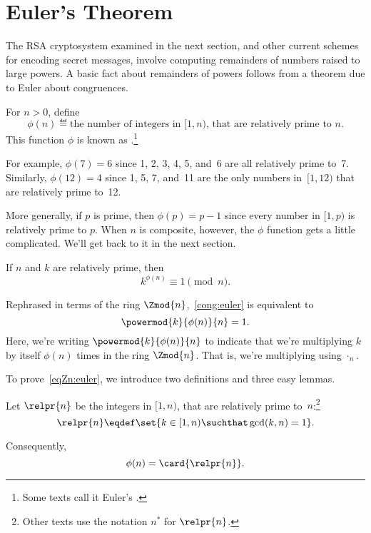 \section{Euler's Theorem}\label{Euler_sec}

The RSA cryptosystem examined in the next section, and other current
schemes for encoding secret messages, involve computing remainders of
numbers raised to large powers.  A basic fact about remainders of
powers follows from a theorem due to Euler about congruences.

\begin{definition}
For $n>0$, define
\[
\phi(n) \eqdef \text{the number of integers in $[1, n)$, that are relatively prime
  to~$n$.}
\]
This function $\phi$ is known as .\footnote{Some texts call it Euler's .}
\end{definition}

For example, $\phi(7) = 6$ since 1, 2, 3, 4, 5, and~6
are all relatively prime to~7.  Similarly, $\phi(12) = 4$ since 1, 5,
7, and~11 are the only numbers in~$[1, 12)$ that are relatively prime
  to~12.

More generally, if $p$ is prime, then $\phi(p) = p - 1$ since every
number in $[1,p)$ is relatively prime to $p$.  When $n$ is composite,
  however, the $\phi$ function gets a little complicated.  We'll get
  back to it in the next section.

\begin{theorem}
If $n$ and $k$ are relatively prime, then
\begin{equation}\label{cong:euler}
k^{\phi(n)} \equiv 1 \pmod{n}.
\end{equation}
\end{theorem}

Rephrased in terms of the ring $\Zmod{n}$,~\eqref{cong:euler} is
equivalent to
\begin{equation}\label{eqZn:euler}
    \powermod{k}{\phi(n)}{n} = 1.
\end{equation}
Here, we're writing $\powermod{k}{\phi(n)}{n}$ to indicate that we're
multiplying $k$ by itself $\phi(n)$ times in the ring $\Zmod{n}$.
That is, we're multiplying using $\cdot_n$.

To prove~\eqref{eqZn:euler}, we introduce two definitions and three
easy lemmas.

\begin{definition}
Let $\relpr{n}$  be the integers in $[1, n)$, that are relatively
  prime to~$n$:\footnote{Other texts use the notation $n^*$ for
  $\relpr{n}$.}
\begin{equation}\label{def:relpr}
\relpr{n} \eqdef \set{k \in [1,n) \suchthat \gcd(k,n) = 1}.
\end{equation}
\end{definition}
Consequently,
\[
\phi(n) = \card{\relpr{n}}.
\]

